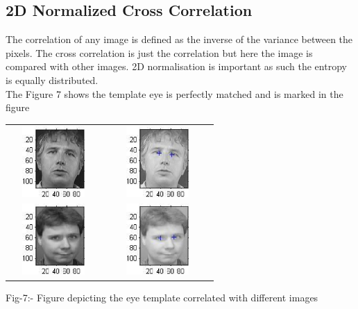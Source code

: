 \documentclass[final,3p,times,twocolumn,sort&compress]{elsarticle}
\begin{document}
\subsection{2D Normalized Cross Correlation}
\hspace{1cm} The correlation of any image is defined as the inverse of the variance between the pixels. The cross correlation is just the correlation but here the image is compared with other images. 2D normalisation is important as such the entropy is equally distributed. \\
\hspace{1cm} The Figure 7 shows the template eye is perfectly matched and is marked in the figure
\begin{table}[htbp]
  \begin{center}
  \begin{tabular}{cc}
    \includegraphics[width=3.3cm,height=2.7cm]{cross1} &  \includegraphics[width=3.9cm,height=2.7cm]{cross2} \\
    \includegraphics[width=3.3cm,height=2.7cm]{cross3} &  \includegraphics[width=3.9cm,height=2.7cm]{cross4} \\
     \end{tabular}
Fig-7:- Figure depicting the eye template correlated with different images
 \end{center}
 \end{table}
\end{document}
